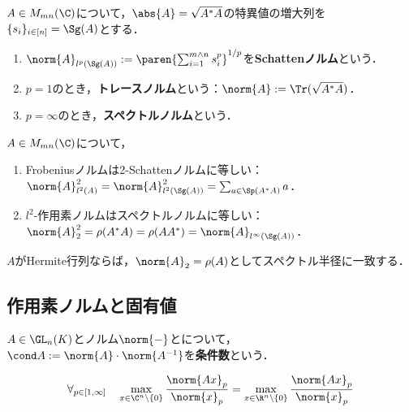 \documentclass[uplatex, dvipdfmx]{jsreport}
\begin{document}
\begin{definition}
    $A\in M_{mn}(\C)$について，$\abs{A}=\sqrt{A^*A}$の特異値の増大列を$\{s_i\}_{i\in[n]}=\Sg(A)$とする．
    \begin{enumerate}
        \item $\norm{A}_{l^p(\Sg(A))}:=\paren{\sum_{i=1}^{m\land n}s_i^p}^{1/p}$を\textbf{Schattenノルム}という．
        \item $p=1$のとき，\textbf{トレースノルム}という：$\norm{A}:=\Tr(\sqrt{A^*A})$．
        \item $p=\infty$のとき，\textbf{スペクトルノルム}という．
    \end{enumerate}
\end{definition}

\begin{proposition}
    $A\in M_{mn}(\C)$について，
    \begin{enumerate}
        \item Frobeniusノルムは2-Schattenノルムに等しい：$\norm{A}_{l^2(A)}^2=\norm{A}_{l^2(\Sg(A))}^2=\sum_{a\in\Sp(A^*A)}a$．
        \item $l^2$-作用素ノルムはスペクトルノルムに等しい：$\norm{A}_{2}^2=\rho(A^*A)=\rho(AA^*)=\norm{A}_{l^\infty(\Sg(A))}$．
    \end{enumerate}
\end{proposition}
\begin{remarks}
    $A$がHermite行列ならば，$\norm{A}_2=\rho(A)$としてスペクトル半径に一致する．
\end{remarks}

\subsection{作用素ノルムと固有値}

\begin{definition}
    $A\in\GL_n(K)$とノルム$\norm{-}$とについて，
    $\cond A:=\norm{A}\cdot\norm{A^{-1}}$を\textbf{条件数}という．
\end{definition}

\begin{lemma}
    \[\forall_{p\in[1,\infty]}\quad\max_{x\in\C^n\setminus\{0\}}\frac{\norm{Ax}_p}{\norm{x}_p}=\max_{x\in\R^n\setminus\{0\}}\frac{\norm{Ax}_p}{\norm{x}_p}\]
\end{lemma}
\end{document}
